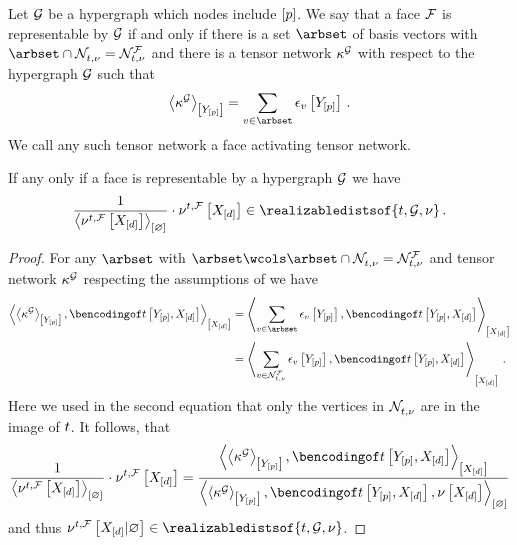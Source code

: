 \begin{definition}
    \label{def:faceRepresentability}
    Let $\mathcal{G}$ be a hypergraph which nodes include $[p]$.
    We say that a face $\mathcal{F}$ is representable by $\mathcal{G}$ if and only if there is a set $\arbset$ of basis vectors with $\arbset\cap\genimset = \genfaceimset$ and there is a tensor network $\kappa^{\mathcal{G}}$ with respect to the hypergraph $\mathcal{G}$ such that
    \begin{align*}
        \contractionof{\kcoreof{\graph}}{\headvariables}
        = \sum_{\imelement\in\arbset} \onehotmapofat{\imelement}{\headvariables} \, . %
    \end{align*}
    We call any such tensor network a face activating tensor network.
\end{definition}

\begin{lemma}
    \label{lem:faceMeasureRepresentation}
    If any only if a face is representable by a hypergraph $\mathcal{G}$ we have
    \begin{align*}
        \frac{1}{\contraction{\genfacemeasurewith}} \cdot \genfacemeasurewith
        \in \realizabledistsof{\sstat,\graph,\basemeasure} \, .
    \end{align*}
\end{lemma}
\begin{proof}
    For any $\arbset$ with $\arbset \wcols \arbset\cap\genimset = \genfaceimset$ and tensor network $\kappa^{\mathcal{G}}$ respecting the assumptions of  we have
    \begin{align*}
        \contractionof{\contractionof{\kcoreof{\graph}}{\headvariables},\bencsstatwith}{\shortcatvariables}
        &= \contractionof{\sum_{\imelement\in\arbset}\onehotmapofat{\imelement}{\headvariables},\bencsstatwith}{\shortcatvariables} \\
        &= \contractionof{\sum_{\imelement\in\genfaceimset}\onehotmapofat{\imelement}{\headvariables},\bencsstatwith}{\shortcatvariables} \, .
    \end{align*}
    Here we used in the second equation that only the vertices in $\mathcal{N}_{t,\nu}^{} $ are in the image of $t$.
    It follows, that
    \begin{align*}
        \frac{1}{\contraction{\genfacemeasurewith}} \cdot \genfacemeasurewith
        = \frac{
            \contractionof{\contractionof{\kcoreof{\graph}}{\headvariables},\bencsstatwith}{\shortcatvariables}
        }{
            \contraction{\contractionof{\kcoreof{\graph}}{\headvariables},\bencsstatwith,\basemeasurewith}
        }
    \end{align*}
    and thus $\genfacemeasureat{\shortcatvariables|\varnothing} \in \realizabledistsof{\sstat,\graph,\basemeasure}$.
\end{proof}

